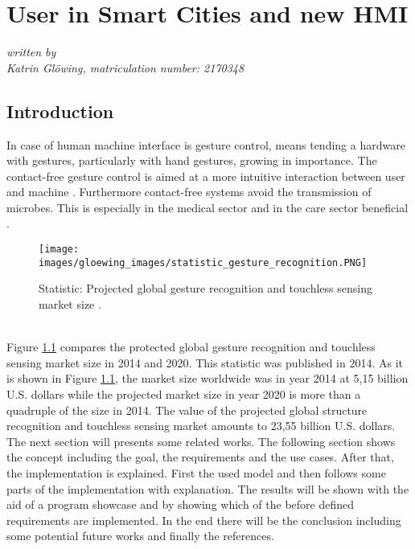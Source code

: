 \chapter{User in Smart Cities and new HMI}
\label{intro} 
\textsl{written by \\ Katrin Glöwing, matriculation number: 2170348} 
\\


\section{Introduction}
\label{sec:introduction}
In case of human machine interface is gesture control, means tending a hardware with gestures, particularly with hand gestures, growing in importance. The contact-free gesture control is aimed at a more intuitive interaction between user and machine \cite{Sommer2013}. Furthermore contact-free systems avoid the transmission of microbes. This is especially in the medical sector and in the care sector beneficial \cite{keiser2015gestensteuerung}.
\begin{figure}
\sidecaption
\texttt{[image: images/gloewing\_images/statistic\_gesture\_recognition.PNG]}
\caption{Statistic: Projected global gesture recognition and touchless sensing market size \cite{statista2019}.}
\label{fig:statistic}
\end{figure}\\
Figure \ref{fig:statistic} compares the protected global gesture recognition and touchless sensing market size in 2014 and 2020. This statistic was published in 2014. As it is shown in Figure \ref{fig:statistic}, the market size worldwide was in year 2014 at 5,15 billion U.S. dollars while the projected market size in year 2020 is more than a quadruple of the size in 2014. The value of the projected global structure recognition and touchless sensing market amounts to 23,55 billion U.S. dollars.\\
The next section will presents some related works. The following section shows the concept including the goal, the requirements and the use cases. After that, the implementation is explained. First the used model and then follows some parts of the implementation with explanation. The results will be shown with the aid of a program showcase and by showing which of the before defined requirements are implemented. In the end there will be the conclusion including some potential future works and finally the references.


